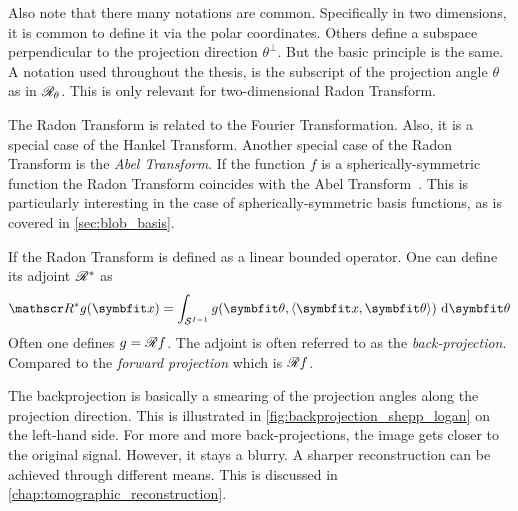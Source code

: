 Also note that there many notations are common. Specifically in two dimensions, it is common to
define it via the polar coordinates. Others define a subspace perpendicular to the projection
direction \(\theta^\perp\). But the basic principle is the same. A notation used throughout the
thesis, is the subscript of the projection angle \(\theta\) as in \(\mathscr{R}_\theta\). This is only
relevant for two-dimensional Radon Transform.

The Radon Transform is related to the Fourier Transformation. Also, it is a special case of the
Hankel Transform. Another special case of the Radon Transform is the \textit{Abel Transform}. If the
function \(f\) is a spherically-symmetric function the Radon Transform coincides with the Abel
Transform~\cite{buzug_computed_2008}. This is particularly interesting in the case of
spherically-symmetric basis functions, as is covered in \autoref{sec:blob_basis}.

\begin{definition}\label{def:back_projection}
	If the Radon Transform is defined as a linear bounded operator. One can define its adjoint
	\(\mathscr{R}^\ast\) as
	\[ \radon^\ast g (\mvec{x}) = \int_{\mathcal{S}^{I-1}} g(\mvec{\theta}, \langle \mvec{x}, \mvec{\theta} \rangle) \, \, \mathrm{d} \mvec{\theta} \]
	Often one defines \(g = \mathscr{R} f\). The adjoint is often referred to as the
	\textit{back-projection}. Compared to the \textit{forward projection} which is \(\mathscr{R} f\).
\end{definition}

The backprojection is basically a smearing of the projection angles along the projection direction.
This is illustrated in \autoref{fig:backprojection_shepp_logan} on the left-hand side. For more and
more back-projections, the image gets closer to the original signal. However, it stays a blurry. A
sharper reconstruction can be achieved through different means. This is discussed in
\autoref{chap:tomographic_reconstruction}.

